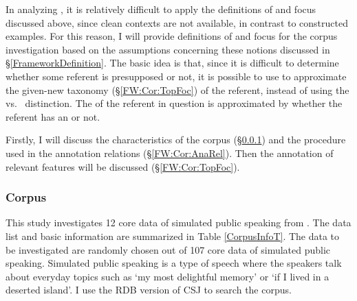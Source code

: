 In analyzing ,
it is relatively difficult to apply the definitions of  and focus discussed above, since clean contexts are not available, in contrast to constructed examples.
For this reason,
I will provide definitions of  and focus for the corpus investigation
based on the assumptions concerning these notions discussed in \S \ref{FrameworkDefinition}.
The basic idea is that, since it is difficult to determine
whether some  referent is presupposed or not,
it is possible to use  to approximate the given-new taxonomy (\S \ref{FW:Cor:TopFoc})
of the referent,
instead of using the  vs.\  distinction.
The  of the referent in question is approximated
by whether the referent has an  or not.

Firstly, I will discuss the characteristics of the corpus (\S \ref{FW:Cor:Cor})
and the procedure used in the annotation  relations (\S \ref{FW:Cor:AnaRel}).
Then the annotation of relevant features will be discussed (\S \ref{FW:Cor:TopFoc}).

\subsubsection{Corpus}\label{FW:Cor:Cor}

This study investigates 12 core data of simulated public speaking 
from  \cite[CSJ:][]{maekawa03,maekawaetal04}.
The data list and basic information are summarized in Table \ref{CorpusInfoT}.
The data to be investigated are randomly chosen out of 107 core data of simulated public speaking.
Simulated public speaking is a type of speech
where the speakers talk about everyday topics
such as `my most delightful memory' or `if I lived in a deserted island'.
I use the RDB version of CSJ \cite{koisoetal12} to search the corpus.

